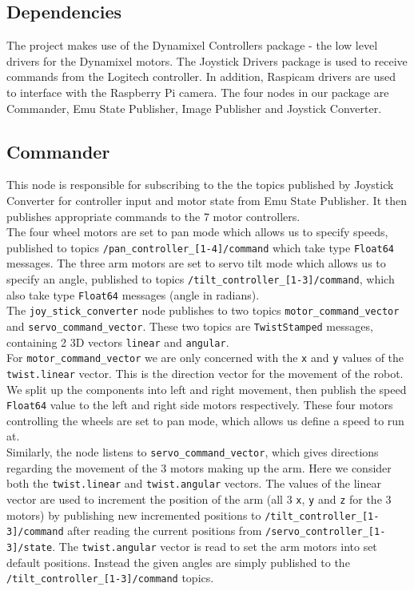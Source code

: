 \documentclass[titlepage,12pt,a4paper]{article}
\begin{document}
\subsection*{Dependencies}

\noindent The project makes use of the Dynamixel Controllers package - the low level drivers for the Dynamixel motors. The Joystick Drivers package is used to receive commands from the Logitech controller. In addition, Raspicam drivers are used to interface with the Raspberry Pi camera.
The four nodes in our package are Commander, Emu State Publisher, Image Publisher and Joystick Converter.

\subsection*{Commander}
This node is responsible for subscribing to the the topics published by Joystick Converter for controller input and motor state from Emu State Publisher. It then publishes appropriate commands to the 7 motor controllers.\\

\noindent The four wheel motors are set to pan mode which allows us to specify speeds, published to topics \texttt{/pan\_controller\_[1-4]/command} which take type \texttt{Float64} messages. The three arm motors are set to servo tilt mode which allows us to specify an angle, published to topics \texttt{/tilt\_controller\_[1-3]/command}, which also take type \texttt{Float64} messages (angle in radians).\\

\noindent The \texttt{joy\_stick\_converter} node publishes to two topics \texttt{motor\_command\_vector} and \texttt{servo\_command\_vector}. These two topics are \texttt{TwistStamped} messages, containing 2 3D vectors \texttt{linear} and \texttt{angular}.\\

\noindent For \texttt{motor\_command\_vector} we are only concerned with the \texttt{x} and \texttt{y} values of the \texttt{twist.linear} vector. This is the direction vector for the movement of the robot. We split up the components into left and right movement, then publish the speed \texttt{Float64} value to the left and right side motors respectively. These four motors controlling the wheels are set to pan mode, which allows us define a speed to run at.\\

\noindent Similarly, the node listens to \texttt{servo\_command\_vector}, which gives directions regarding the movement of the 3 motors making up the arm. Here we consider both the \texttt{twist.linear} and \texttt{twist.angular} vectors. The values of the linear vector are used to increment the position of the arm (all 3 \texttt{x}, \texttt{y} and \texttt{z} for the 3 motors) by publishing new incremented positions to \texttt{/tilt\_controller\_[1-3]/command} after reading the current positions from \texttt{/servo\_controller\_[1-3]/state}. The \texttt{twist.angular} vector is read to set the arm motors into set default positions. Instead the given angles are simply published to the \texttt{/tilt\_controller\_[1-3]/command} topics. \\
\end{document}
